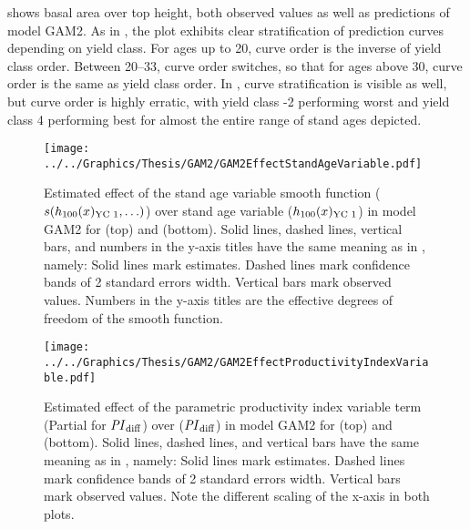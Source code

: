  shows basal area over top height, both observed values as well as predictions of model GAM2.  As in , the \Beech{} plot exhibits clear stratification of prediction curves depending on yield class.  For ages up to \SI{20}{\year}, curve order is the inverse of yield class order. Between \SIrange{20}{33}{\year}, curve order switches, so that for ages above \SI{30}{\year}, curve order is the same as yield class order.  In \Spruce{}, curve stratification is visible as well, but curve order is highly erratic, with yield class -2 performing worst and yield class 4 performing best for almost the entire range of stand ages depicted.

\begin{figure}[h]
  \centering
  \texttt{[image: ../../Graphics/Thesis/GAM2/GAM2EffectStandAgeVariable.pdf]}
  \caption{Estimated effect of the stand age variable smooth function (\(s(h_{100}(x)_{\text{YC 1}}{}, \ldots)\)) over stand age variable (\(h_{100}(x)_{\text{YC 1}}{}\)) in model GAM2 for \Beech{} (top) and \Spruce{} (bottom).   Solid lines, dashed lines, vertical bars, and numbers in the y-axis titles have the same meaning as in , namely:  Solid lines mark estimates.  Dashed lines mark confidence bands of 2 standard errors width.  Vertical bars mark observed values.  Numbers in the y-axis titles are the effective degrees of freedom of the smooth function.}
  \label{fig:GAM2EffectStandAgeVariable}
\end{figure}

\begin{figure}[h]
  \centering
  \texttt{[image: ../../Graphics/Thesis/GAM2/GAM2EffectProductivityIndexVariable.pdf]}
  \caption{Estimated effect of the parametric productivity index variable term (Partial for \(\mathit{PI}_{\text{diff}}{}\)) over \ProductivityIndexVariableText{} (\(\mathit{PI}_{\text{diff}}{}\)) in model GAM2 for \Beech{} (top) and \Spruce{} (bottom).   Solid lines, dashed lines, and vertical bars have the same meaning as in , namely:  Solid lines mark estimates.  Dashed lines mark confidence bands of 2 standard errors width.  Vertical bars mark observed values.  Note the different scaling of the x-axis in both plots.}
  \label{fig:GAM2EffectProductivityIndexVariable}
\end{figure}

